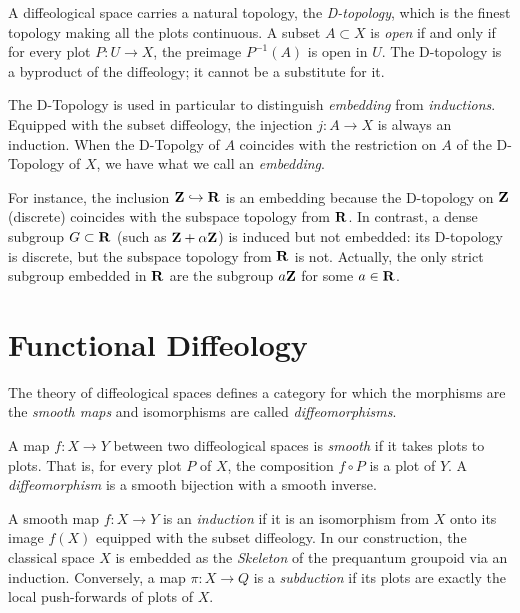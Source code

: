   \begin{article}
    A diffeological space carries a natural topology,
    the \emph{D-topology},
    which is the finest topology making all the plots continuous.
    A subset $A \subset X$ is \emph{open} if and only if for every plot $P: U \to X$,
    the preimage $P^{-1}(A)$ is open in $U$.
    The D-topology is a byproduct of the diffeology;
    it cannot be a substitute for it.
    
    The D-Topology is used in particular to distinguish \emph{embedding} from \emph{inductions}.
    Equipped with the subset diffeology,
    the injection $j: A \to X$ is always an induction.
    When the D-Topolgy of $A$ coincides with the restriction on $A$ of the D-Topology of $X$,
    we have what we call an \emph{embedding}.
    
    For instance, the inclusion ${\mathbf{Z}} \hookrightarrow {\mathbf{R}}$ is an embedding because
    the D-topology on ${\mathbf{Z}}$ (discrete) coincides with the subspace topology from ${\mathbf{R}}$.
    In contrast, a dense subgroup $G \subset {\mathbf{R}}$ (such as ${\mathbf{Z}} + \alpha{\mathbf{Z}}$) is
    induced but not embedded: its D-topology is discrete, but the subspace topology
    from ${\mathbf{R}}$ is not.
    Actually,
    the only strict subgroup embedded in ${\mathbf{R}}$ are the subgroup $a{\mathbf{Z}}$ for some $a \in {\mathbf{R}}$.
  \end{article}
  
  \section{Functional Diffeology}
  \label{sec:Functional Diffeology}
  
  The theory of diffeological spaces defines a category for which the morphisms are the \emph{smooth maps} and isomorphisms are called \emph{diffeomorphisms}.
  
  \begin{article}
    A map $f: X \to Y$ between two diffeological spaces is \emph{smooth} if it takes plots to plots.
    That is,
    for every plot $P$ of $X$,
    the composition $f \circ P$ is a plot of $Y$.
    A \emph{diffeomorphism} is a smooth bijection with a smooth inverse.
  \end{article}
  
  \begin{article}
    A smooth map $f: X \to Y$ is an \emph{induction} if it is an isomorphism from $X$ onto its image $f(X)$ equipped with the subset diffeology.
    In our construction,
    the classical space $X$ is embedded as the \emph{Skeleton} of the prequantum groupoid via an induction.
    Conversely,
    a map $\pi: X \to Q$ is a \emph{subduction} if its plots are exactly the local push-forwards of plots of $X$.
  \end{article}
  
